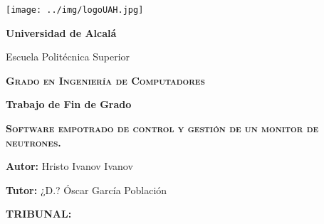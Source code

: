 
\enlargethispage{1cm}
\thispagestyle{empty}

\begin{center}
\texttt{[image: ../img/logoUAH.jpg]}
\par\end{center}

\begin{center}
\textbf{\huge Universidad de Alcalá}
\par\end{center}{\huge \par}

\begin{center}
{\Large Escuela Politécnica Superior}
\par\end{center}{\Large \par}

\medskip{}


\begin{center}
\textbf{\textsc{\huge Grado en Ingeniería de Computadores }}
\par\end{center}{\huge \par}

\medskip{}


\begin{center}
\textbf{\Large Trabajo de Fin de Grado}
\par\end{center}{\Large \par}

\begin{center}
\textbf{\textsc{\LARGE 
  Software empotrado de control y gestión de un monitor de neutrones.
}}
\par\end{center}{\LARGE \par}

\medskip{}


\begin{center}
\textbf{\large Autor:}{\large{} Hristo Ivanov Ivanov}
\par\end{center}{\large \par}
\begin{center}
\textbf{\large Tutor:}{\large{} ¿D.? Óscar García Población }
\par\end{center}{\large \par}

\vspace{1.0cm}
\textbf{\Large TRIBUNAL:}{\Large \par}

